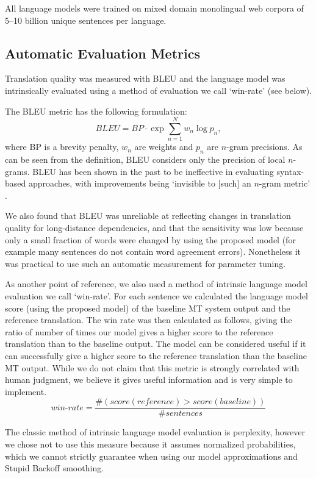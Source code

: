 \documentclass[english]{jnlp_1.4}
\begin{document}
All language models were trained on mixed domain monolingual web corpora of
5--10 billion unique sentences per language.


\subsection{Automatic Evaluation Metrics}

Translation quality was measured with BLEU \cite{BLEU} and the language model was
intrinsically evaluated using a method of evaluation we call `win-rate' (see below).

The BLEU metric has the following formulation:
\begin{equation}
BLEU = BP \cdot \exp{\sum_{n=1}^N{w_n \log{p_n}}},
\end{equation}
where BP is a brevity penalty, $w_n$ are weights and $p_n$ are $n$-gram precisions.
As can be seen from the definition, BLEU considers only the precision of local $n$-grams.
BLEU has been shown in the past to be ineffective in evaluating syntax-based
approaches, with improvements being `invisible to [such] an $n$-gram metric' \cite{Sennrich15}.

We also found that BLEU was unreliable at reflecting changes in translation quality for long-distance
dependencies, and that the sensitivity was low because only a small fraction of words
were changed by using the proposed model (for example many sentences do not contain word agreement errors).
Nonetheless it was practical to use such an automatic measurement for parameter tuning.

As another point of reference, we also used a method of intrinsic language model evaluation we call `win-rate'.
For each sentence we calculated the language model score (using the proposed model)
of the baseline MT system output and the reference translation. The win rate was then
calculated as follows, giving the ratio of number of times our model gives a higher score to the
reference translation than to the baseline output. The model can be considered useful if it can successfully
give a higher score to the reference translation than the baseline MT output.
While we do not claim that this metric is strongly correlated with human judgment,
we believe it gives useful information and is very simple to implement.
\begin{equation}
win\mbox{-}rate = \frac{\#(score(reference) > score(baseline))}{\# sentences}
\end{equation}

The classic method of intrinsic language model evaluation is perplexity,
however we chose not to use this measure because it assumes normalized
probabilities, which we cannot strictly guarantee when using our model approximations
and Stupid Backoff smoothing.
\end{document}
